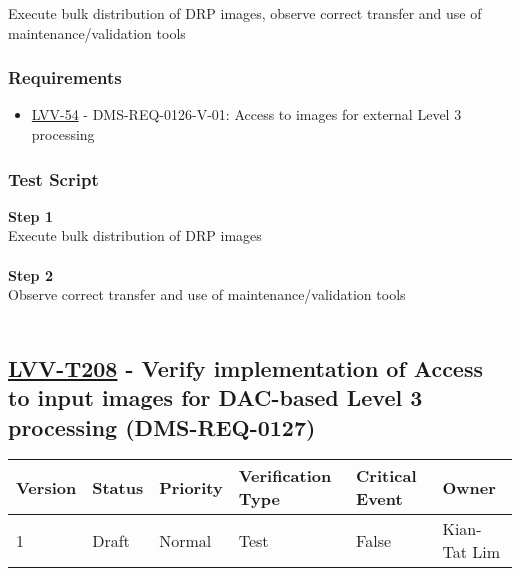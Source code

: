 Execute bulk distribution of DRP images, observe correct transfer and
use of maintenance/validation tools

\hypertarget{requirements-184}{%
\subsubsection{Requirements}\label{requirements-184}}

\begin{itemize}
\tightlist
\item
  \href{https://jira.lsstcorp.org/browse/LVV-54}{LVV-54} -
  DMS-REQ-0126-V-01: Access to images for external Level 3 processing
\end{itemize}

\hypertarget{test-script-184}{%
\subsubsection{Test Script}\label{test-script-184}}

\textbf{Step 1}\\
Execute bulk distribution of DRP images\\
~\\
\textbf{Step 2}\\
Observe correct transfer and use of maintenance/validation tools\\
~\\

\hypertarget{lvv-t208---verify-implementation-of-access-to-input-images-for-dac-based-level-3-processing-dms-req-0127}{%
\subsection{\texorpdfstring{\href{https://jira.lsstcorp.org/secure/Tests.jspa\#/testCase/LVV-T208}{LVV-T208}
- Verify implementation of Access to input images for DAC-based Level 3
processing
(DMS-REQ-0127)}{LVV-T208 - Verify implementation of Access to input images for DAC-based Level 3 processing (DMS-REQ-0127)}}\label{lvv-t208---verify-implementation-of-access-to-input-images-for-dac-based-level-3-processing-dms-req-0127}}

\begin{longtable}[]{@{}llllll@{}}
\toprule
Version & Status & Priority & Verification Type & Critical Event &
Owner\tabularnewline
\midrule
\endhead
1 & Draft & Normal & Test & False & Kian-Tat Lim\tabularnewline
\bottomrule
\end{longtable}

